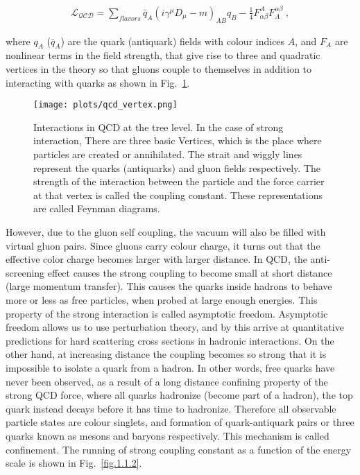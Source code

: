 \begin{equation}
    \label{eq.1.1}
    \begin{aligned}
        \mathcal{L_{QCD}}=\sum_{flavors}\bar{q}_{A}(i\gamma^{\mu}D_{\mu}-m)_{AB}q_{B}-\frac{1}{4}F^{A}_{\alpha\beta}F^{\alpha\beta}_{A}~,
    \end{aligned}
\end{equation}

\noindent where $q_A$ ($\bar{q}_{A}$) are the quark (antiquark) fields with colour indices $A$, and $F_{A}$ are nonlinear terms in the field strength, that give rise to three and quadratic vertices in the theory so that gluons couple to themselves in addition to interacting with quarks as shown in Fig.~\ref{fig.1.1.1}.

\begin{figure}[H]
    \centering
        \texttt{[image: plots/qcd\_vertex.png]}
        \caption{Interactions in QCD at the tree level. In the case of strong interaction, There are three basic Vertices, which is the place where particles are created or annihilated. The strait and wiggly lines represent the quarks (antiquarks) and gluon fields respectively. The strength of the interaction between the particle and the force carrier at that vertex is called the coupling constant. These representations are called Feynman diagrams.}
        \label{fig.1.1.1}
\end{figure}

However, due to the gluon self coupling, the vacuum will also be filled with virtual gluon pairs. Since gluons carry colour charge, it turns out that the effective color charge becomes larger with larger distance. In QCD, the anti-screening effect causes the strong coupling to become small at short distance (large momentum transfer). This causes the quarks inside hadrons to behave more or less as free particles, when probed at large enough energies. This property of the strong interaction is called asymptotic freedom. Asymptotic freedom allows us to use perturbation theory, and by this arrive at quantitative predictions for hard scattering cross sections in hadronic interactions. On the other hand, at increasing distance the coupling becomes so strong that it is impossible to isolate a quark from a hadron. In other words, free quarks have never been observed, as a result of a long distance confining property of the strong QCD force, where all quarks hadronize (become part of a hadron), the top quark instead decays before it has time to hadronize. Therefore all observable particle states are colour singlets, and formation of quark-antiquark pairs or three quarks known as mesons and baryons respectively. This mechanism is called confinement. The running of strong coupling constant as a function of the energy scale is shown in Fig.~\ref{fig.1.1.2}.

